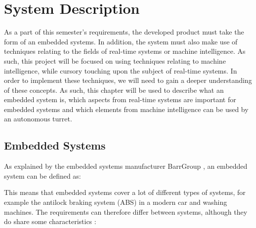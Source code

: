 \chapter{System Description}\label{SystemDescription}
As a part of this semester's requirements, the developed product must take the
form of an embedded systems. In addition, the system must also make use of
techniques relating to the fields of real-time systems or machine intelligence.
As such, this project will be focused on using techniques relating to machine
intelligence, while cursory touching upon the subject of real-time systems. In
order to implement these techniques, we will need to gain a deeper understanding
of these concepts. As such, this chapter will be used to describe what an
embedded system is, which aspects from real-time systems are important for
embedded systems and which elements from machine intelligence can be
used by an autonomous turret.

\section{Embedded Systems}
As explained by the embedded systems manufacturer BarrGroup
\citep{Barr_Embedded}, an embedded system can be defined as: \nl

\begin{center}
\begin{minipage}{0.8\linewidth}
\end{minipage}
\end{center}
% 

This means that embedded systems cover a lot of different types of systems, for
example the antilock braking system (ABS) in a modern car and washing machines.
The requirements can therefore differ between systems, although they do share
some characteristics \citep[ch.1.1]{vahid1999embedded}:


